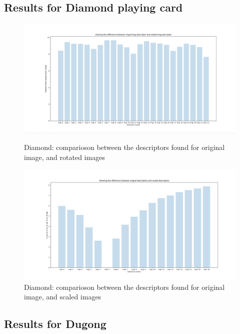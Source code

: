 \documentclass[conference]{IEEEtran}
\begin{document}
\subsection{Results for Diamond playing card}
\begin{figure}[!htb]
  \centering
  \begin{minipage}[b]{0.4\textwidth}
    \includegraphics[width=\textwidth]{../programme/results/Task_2/diamond/rotation/norm.png}
    \caption{Diamond: comparioson between the descriptors found for original image, and rotated images}
    \label{Diamond: comparioson between the descriptors found for original image, and rotated images}
  \end{minipage}
  \hfill
  \begin{minipage}[b]{0.4\textwidth}
    \includegraphics[width=\textwidth]{../programme/results/Task_2/diamond/scaling/norm.png}
    \caption{Diamond: comparioson between the descriptors found for original image, and scaled images}
    \label{Diamond: comparioson between the descriptors found for original image, and scaled images}
  \end{minipage}
\end{figure}

\subsection{Results for Dugong} \hfill\\ \\
\end{document}

